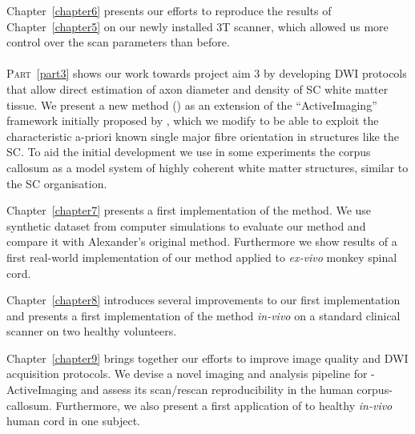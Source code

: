 Chapter~\ref{chapter6} presents our efforts to reproduce the results of Chapter~\ref{chapter5} on our newly installed 3T scanner, which allowed us more control over the scan parameters than before. 

\paragraph{}{\scshape{Part}}~{\protect\ref{part3}} shows our work towards project aim 3 by developing \gls{DWI} protocols that allow direct estimation of axon diameter and density of SC white matter tissue. We present a new method ({\SF}) as an extension of the ``ActiveImaging'' framework initially proposed by \citet{Alexander:2008}, which we modify to be able to exploit the characteristic a-priori known single major fibre orientation in structures like the \gls{SC}. To aid the initial development we use in some experiments the corpus callosum as a model system of highly coherent white matter structures, similar to the \gls{SC} organisation.

Chapter~\ref{chapter7} presents a first implementation of the {\SF} method. We use synthetic dataset from computer simulations to evaluate our method and compare it with Alexander's original method. Furthermore we show results of a first real-world implementation of our method applied to \emph{ex-vivo} monkey spinal cord.

Chapter~\ref{chapter8} introduces several improvements to our first {\SF} implementation and presents a first implementation of the {\SF} method \emph{in-vivo} on a standard clinical scanner on two healthy volunteers. 

Chapter~\ref{chapter9} brings together our efforts to improve image quality and \gls{DWI} acquisition protocols. We devise a novel imaging and analysis pipeline for  {\SF}-ActiveImaging and assess its scan/rescan reproducibility in the human corpus-callosum. Furthermore, we also present a first application of {\SF} to healthy \emph{in-vivo} human cord in one subject.

